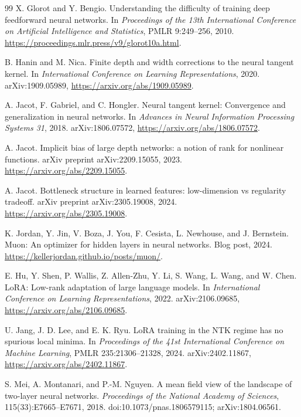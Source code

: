 \documentclass{article}
\begin{document}
\begin{thebibliography}{99}
X. Glorot and Y. Bengio.
\newblock Understanding the difficulty of training deep feedforward neural networks.
\newblock In \emph{Proceedings of the 13th International Conference on Artificial Intelligence and Statistics}, PMLR 9:249--256, 2010.
\newblock \url{https://proceedings.mlr.press/v9/glorot10a.html}.

B. Hanin and M. Nica.
\newblock Finite depth and width corrections to the neural tangent kernel.
\newblock In \emph{International Conference on Learning Representations}, 2020.
\newblock arXiv:1909.05989, \url{https://arxiv.org/abs/1909.05989}.

A. Jacot, F. Gabriel, and C. Hongler.
\newblock Neural tangent kernel: Convergence and generalization in neural networks.
\newblock In \emph{Advances in Neural Information Processing Systems 31}, 2018.
\newblock arXiv:1806.07572, \url{https://arxiv.org/abs/1806.07572}.

A. Jacot.
\newblock Implicit bias of large depth networks: a notion of rank for nonlinear functions.
\newblock arXiv preprint arXiv:2209.15055, 2023.
\newblock \url{https://arxiv.org/abs/2209.15055}.

A. Jacot.
\newblock Bottleneck structure in learned features: low-dimension vs regularity tradeoff.
\newblock arXiv preprint arXiv:2305.19008, 2024.
\newblock \url{https://arxiv.org/abs/2305.19008}.

K. Jordan, Y. Jin, V. Boza, J. You, F. Cesista, L. Newhouse, and J. Bernstein.
\newblock Muon: An optimizer for hidden layers in neural networks.
\newblock Blog post, 2024.
\newblock \url{https://kellerjordan.github.io/posts/muon/}.

E. Hu, Y. Shen, P. Wallis, Z. Allen-Zhu, Y. Li, S. Wang, L. Wang, and W. Chen.
\newblock LoRA: Low-rank adaptation of large language models.
\newblock In \emph{International Conference on Learning Representations}, 2022.
\newblock arXiv:2106.09685, \url{https://arxiv.org/abs/2106.09685}.

U. Jang, J. D. Lee, and E. K. Ryu.
\newblock LoRA training in the NTK regime has no spurious local minima.
\newblock In \emph{Proceedings of the 41st International Conference on Machine Learning}, PMLR 235:21306--21328, 2024.
\newblock arXiv:2402.11867, \url{https://arxiv.org/abs/2402.11867}.

S. Mei, A. Montanari, and P.-M. Nguyen.
\newblock A mean field view of the landscape of two-layer neural networks.
\newblock \emph{Proceedings of the National Academy of Sciences}, 115(33):E7665--E7671, 2018.
\newblock doi:10.1073/pnas.1806579115; arXiv:1804.06561.


\end{thebibliography}
\end{document}
